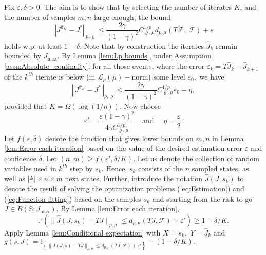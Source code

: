 \documentclass[12pt,technote,onecolumn]{IEEEtran}
\begin{document}
\begin{IEEEproof}
		Fix $\varepsilon,\delta>0.$ The aim is to show that by selecting
		the number of iterates $K$, and the number of samples $m,n$ large
		enough, the bound	
		\begin{equation}
		\left\Vert J^{\widehat{\pi}_{K}}-J^{*}\right\Vert _{p,\varrho}\leq\frac{2\gamma}{\left(1-\gamma\right)^{2}}C_{\varrho,\mu}^{1/p}d_{p,\mu}\left(T\mathcal{F},\:\mathcal{F}\right)+\varepsilon\label{eq:Final bound}
		\end{equation}
		holds w.p. at least $1-\delta.$ Note that by construction the iterates
		$\widehat{J}_{k}$ remain bounded by $J_{\max}.$ By Lemma \ref{lem:Lp bounds},
		under Assumption \ref{assu:Absolute_continuity}, for all those events,
		where the error $\varepsilon_{k}=T\widehat{J}_{k}-\widehat{J}_{k+1}$
		of the $k^{th}$ iterate is below (in $\mathcal{L}_{p}\left(\mu\right)-$norm)
		some level $\varepsilon_{0},$ we have		
		\begin{equation}
		\left\Vert J^{\widehat{\pi}_{K}}-J^{*}\right\Vert _{p,\varrho}\leq\frac{2\gamma}{\left(1-\gamma\right)^{2}}C_{\varrho,\mu}^{1/p}\varepsilon_{0}+\eta,\label{eq:K_th iterate}
		\end{equation}
		provided that $K=\Omega\left(\log\left(1/\eta\right)\right).$ Now
		choose 	
		\[
		\varepsilon'=\frac{\varepsilon\left(1-\gamma\right)^{2}}{4\gamma C_{\varrho,\mu}^{1/p}}\quad\mbox{and }\quad\eta=\frac{\varepsilon}{2}.
		\]
		Let $f\left(\varepsilon,\delta\right)$ denote the function that
		gives lower bounds on $m,n$ in Lemma \ref{lem:Error each iteration}
		based on the value of the desired estimation error $\varepsilon$ and
		confidence $\delta.$ Let $\left(n,m\right)\geq f\left(\varepsilon',\delta/K\right).$
		Let us denote the collection of random variables used in $k^{th}$
		step by $s_{k}.$ Hence, $s_{k}$ consists of the $n$ sampled states,
		as well as $\left|\mathbb{A}\right|\times n\times m$ next states.
		Further, introduce the notation $\widehat{J}\left(J,s_{k}\right)$
		to denote the result of solving the optimization problems (\ref{eq:Estimation})
		and (\ref{eq:Function fitting}) based on the samples $s_{k}$ and
		starting from the risk-to-go $J\in B\left(\mathbb{S};J_{\max}\right).$
		By Lemma \ref{lem:Error each iteration},	
		\[
		\mathbb{P}(\|\widehat{J}(J,s_{k})-TJ\|_{p,\mu}\leq d_{p,\mu}(TJ,\mathcal{F})+\varepsilon')\geq1-\delta/K.
		\]
		Apply Lemma \ref{lem:Conditional expectation} with $X=s_{k},$ $Y=\widehat{J}_{k}$
		and $g\left(s,J\right)=\mathbb{I}_{\left\{ \|\widehat{J}\left(J,s\right)-TJ\|_{p,\mu}\leq d_{p,\mu}\left(TJ,\mathcal{F}\right)+\varepsilon'\right\} }-\left(1-\delta/K\right).$

\end{IEEEproof}
\end{document}
